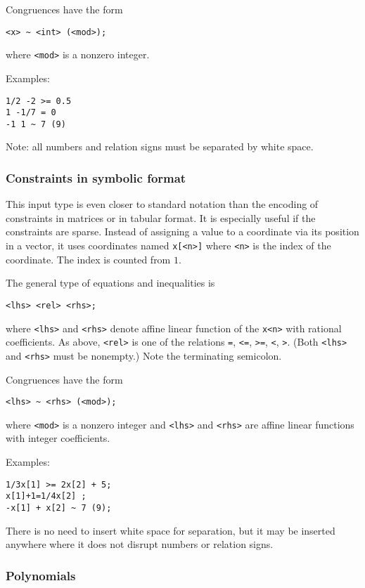 Congruences have the form
\begin{Verbatim}
<x> ~ <int> (<mod>);
\end{Verbatim}
where \verb|<mod>| is a nonzero integer.

Examples:
\begin{Verbatim}
1/2 -2 >= 0.5
1 -1/7 = 0
-1 1 ~ 7 (9)
\end{Verbatim}

Note: all numbers and relation signs must be separated by white space.

\subsubsection{Constraints in symbolic format}\label{symb_syntax}

This input type is even closer to standard notation than the encoding of constraints in matrices or in tabular format. It is especially useful if the constraints are sparse. Instead of assigning a value to a coordinate via its position in a vector, it uses coordinates named \verb|x[<n>]| where \verb|<n>| is the index of the coordinate. The index is counted from $1$.

The general type of equations and inequalities is
\begin{Verbatim}
<lhs> <rel> <rhs>;
\end{Verbatim}
where \verb|<lhs>| and \verb|<rhs>| denote affine linear function of the \verb|x<n>| with rational coefficients.
As above, \verb|<rel>| is one of the relations \verb|=|, \verb|<=|, \verb|>=|, \verb|<|, \verb|>|. (Both \verb|<lhs>| and \verb|<rhs>| must be nonempty.) Note the terminating semicolon.

Congruences have the form
\begin{Verbatim}
<lhs> ~ <rhs> (<mod>);
\end{Verbatim}
where \verb|<mod>| is a nonzero integer and \verb|<lhs>| and \verb|<rhs>| are affine linear functions with integer coefficients.

Examples:
\begin{Verbatim}
1/3x[1] >= 2x[2] + 5;
x[1]+1=1/4x[2] ;
-x[1] + x[2] ~ 7 (9);
\end{Verbatim}

There is no need to insert white space for separation, but it may be inserted anywhere where it does not disrupt numbers or relation signs.

\subsubsection{Polynomials}\label{poly_input}

